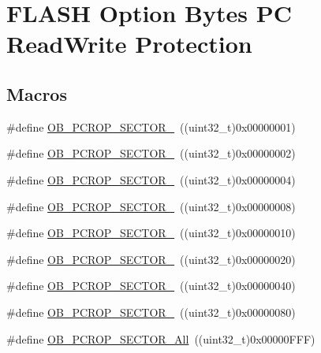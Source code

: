 \hypertarget{group___f_l_a_s_h_ex___option___bytes___p_c___read_write___protection}{}\section{F\+L\+A\+SH Option Bytes PC Read\+Write Protection}
\label{group___f_l_a_s_h_ex___option___bytes___p_c___read_write___protection}
\subsection*{Macros}
\begin{DoxyCompactItemize}
\item 
\#define \hyperlink{group___f_l_a_s_h_ex___option___bytes___p_c___read_write___protection_ga15e8470575c118dd98fd6fa744a8163c}{O\+B\+\_\+\+P\+C\+R\+O\+P\+\_\+\+S\+E\+C\+T\+O\+R\+\_}~((uint32\+\_\+t)0x00000001)
\item 
\#define \hyperlink{group___f_l_a_s_h_ex___option___bytes___p_c___read_write___protection_ga37b79b9eb0dbeaa7ca8b04f6c8c89faa}{O\+B\+\_\+\+P\+C\+R\+O\+P\+\_\+\+S\+E\+C\+T\+O\+R\+\_}~((uint32\+\_\+t)0x00000002)
\item 
\#define \hyperlink{group___f_l_a_s_h_ex___option___bytes___p_c___read_write___protection_gafba6661c0a4510edc55b9d08ba7b1820}{O\+B\+\_\+\+P\+C\+R\+O\+P\+\_\+\+S\+E\+C\+T\+O\+R\+\_}~((uint32\+\_\+t)0x00000004)
\item 
\#define \hyperlink{group___f_l_a_s_h_ex___option___bytes___p_c___read_write___protection_gad93b4f27b039c007d1ed5ca79d744230}{O\+B\+\_\+\+P\+C\+R\+O\+P\+\_\+\+S\+E\+C\+T\+O\+R\+\_}~((uint32\+\_\+t)0x00000008)
\item 
\#define \hyperlink{group___f_l_a_s_h_ex___option___bytes___p_c___read_write___protection_ga10c0d89c778f8920b40adf107eb5ffc8}{O\+B\+\_\+\+P\+C\+R\+O\+P\+\_\+\+S\+E\+C\+T\+O\+R\+\_}~((uint32\+\_\+t)0x00000010)
\item 
\#define \hyperlink{group___f_l_a_s_h_ex___option___bytes___p_c___read_write___protection_ga1d0e173b3e184682b2c90a34e11b0a24}{O\+B\+\_\+\+P\+C\+R\+O\+P\+\_\+\+S\+E\+C\+T\+O\+R\+\_}~((uint32\+\_\+t)0x00000020)
\item 
\#define \hyperlink{group___f_l_a_s_h_ex___option___bytes___p_c___read_write___protection_ga10d6b7983ed196511c8150c12965b407}{O\+B\+\_\+\+P\+C\+R\+O\+P\+\_\+\+S\+E\+C\+T\+O\+R\+\_}~((uint32\+\_\+t)0x00000040)
\item 
\#define \hyperlink{group___f_l_a_s_h_ex___option___bytes___p_c___read_write___protection_ga7d74caf6e88d230f4dcdcbf9ab6d7e1e}{O\+B\+\_\+\+P\+C\+R\+O\+P\+\_\+\+S\+E\+C\+T\+O\+R\+\_}~((uint32\+\_\+t)0x00000080)
\item 
\#define \hyperlink{group___f_l_a_s_h_ex___option___bytes___p_c___read_write___protection_gab0ae871624f4cdff9b41b3fea88a5698}{O\+B\+\_\+\+P\+C\+R\+O\+P\+\_\+\+S\+E\+C\+T\+O\+R\+\_\+\+All}~((uint32\+\_\+t)0x00000\+F\+F\+F)
\end{DoxyCompactItemize}


